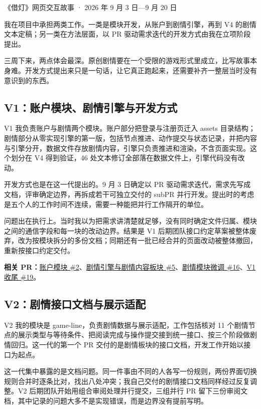 {\small\color{black!55}《借灯》网页交互故事 · 2026 年 9 月 3 日—9 月 20 日\par}

我在项目中承担两类工作。一类是模块开发，从账户到剧情引擎，再到 V4 的剧情文本定稿；另一类在方法层面，以 PR 驱动需求迭代的开发方式由我在立项阶段提出。

三周下来，两点体会最深。原创剧情要在一个受限的游戏形式里成立，比写故事本身难。开发方式提出来只是一句话，让它真正跑起来，还需要补齐一整层当时没有意识到的东西。

\subsection{V1：账户模块、剧情引擎与开发方式}

V1 我负责账户与剧情两个模块。账户部分把登录与注册页迁入 assets 目录结构；剧情部分从零实现引擎的第一版，包括节点推进、动作提交与状态记录，并把内容与引擎分开，数据文件存放剧情内容，引擎只负责推进和渲染，不含页面实现。这个划分在 V4 得到验证，46 处文本修订全部落在数据文件上，引擎代码没有改动。

开发方式也是在这一代提出的。9 月 3 日确定以 PR 驱动需求迭代，需求先写成文档，评审确定边界，再拆成若干可独立交付的 subPR 并行开发。提出时的考虑是五个人的工作时间不连续，需要一种能把并行工作隔开的单位。

问题出在执行上。当时我以为把需求讲清楚就足够，没有同时确定文件归属、模块之间的通信字段和每一块的改动边界。结果是 V1 后期团队接口约定草案被整体废弃，改为按模块拆分的多份文档；同期还有一批已经合并的页面改动被整体撤回，重新按接口约定交付。

\textbf{相关 PR：}\href{https://github.com/214notfound/jiedeng/pull/2}{账户模块 \#2}、\href{https://github.com/214notfound/jiedeng/pull/5}{剧情引擎与剧情内容板块 \#5}、\href{https://github.com/214notfound/jiedeng/pull/16}{剧情模块微调 \#16}、\href{https://github.com/214notfound/jiedeng/pull/19}{V1 收尾 \#19}。

\subsection{V2：剧情接口文档与展示适配}

V2 我的模块是 game-line，负责剧情数据与展示适配，工作包括核对 11 个剧情节点的展示类型与等待条件、把阅读完成与操作提交接到统一接口、按三个阶段做剧情回归。这一代的第一个 PR 交付的是剧情板块的接口文档，开发工作开始以接口为起点。

这一代集中暴露的是文档问题。同一件事由不同的人各写一份规则，两份界面切换规则合并时逐条比对，找出八处冲突；我自己交付的剧情接口文档同样经过反复调整。V2 后期团队开始用组合审阅处理并行提交，三组并行 PR 留下三份审阅文档，其中记录的问题大多不是实现错误，而是边界没有提前写明。

